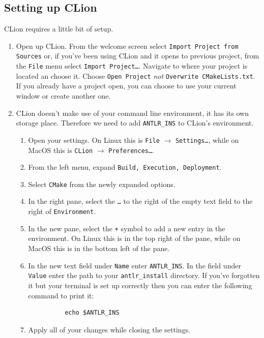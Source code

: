 \documentclass{article}
\newcommand{\code}[1]{\texttt{\textmd{#1}}}
\begin{document}
\subsection{Setting up CLion}
CLion requires a little bit of setup.
\begin{enumerate}
  \item
    Open up CLion. From the welcome screen select \texttt{Import Project from Sources} or, if
    you've been using CLion and it opens to previous project, from the \texttt{File} menu select
    \texttt{Import Project\ldots}. Navigate to where your project is located an choose it. Choose
    \texttt{Open Project} \textit{not} \texttt{Overwrite CMakeLists.txt}. If you already have a
    project open, you can choose to use your current window or create another one.
  \item
    CLion doesn't make use of your command line environment, it has its own storage place.
    Therefore we need to add \code{ANTLR\_INS} to CLion's environment.
    \begin{enumerate}
      \item
        Open your settings. On Linux this is \texttt{File} $\rightarrow$ \texttt{Settings\ldots},
        while on MacOS this is \texttt{CLion} $\rightarrow$ \texttt{Preferences\ldots}.
      \item
        From the left menu, expand \texttt{Build, Execution, Deployment}.
      \item
        Select \texttt{CMake} from the newly expanded options.
      \item
        In the right pane, select the \texttt{\ldots} to the right of the empty text field to the
        right of \texttt{Environment}.
      \item
        In the new pane, select the \texttt{+} symbol to add a new entry in the environment. On
        Linux this is in the top right of the pane, while on MacOS this is in the bottom left of
        the pane.
      \item
        In the new text field under \texttt{Name} enter \code{ANTLR\_INS}. In the field under
        \texttt{Value} enter the path to your \code{antlr\_install} directory. If you've forgotten
        it but your terminal is set up correctly then you can enter the following command to print
        it:
        \begin{lstlisting}
          echo $ANTLR_INS
        \end{lstlisting}
      \item
        Apply all of your changes while closing the settings.

\end{enumerate}
\end{enumerate}
\end{document}
